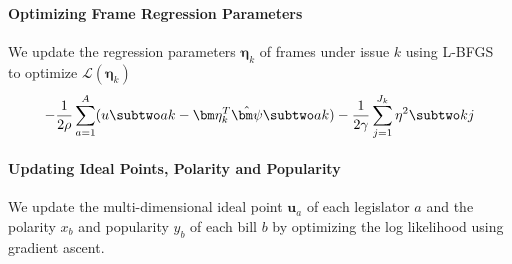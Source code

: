 \paragraph{Optimizing Frame Regression Parameters}
\label{subsec:c6_upadte_eta}

We update the regression parameters $\bm \eta_k$ of frames under issue $k$ using
L-BFGS~\cite{Liu:MP89:lbfgs} to optimize $\mathcal{L}(\bm \eta_k)$
\begin{equation}
  - \frac{1}{2 \rho} \sum_{a=1}^A (u \subtwo ak - \bm \eta_k^T \hat{\bm \psi} \subtwo ak)
  - \frac{1}{2 \gamma} \sum_{j=1}^{J_k} \eta^2 \subtwo kj
\end{equation}

\paragraph{Updating Ideal Points, Polarity and Popularity}
\label{subsec:c6_upadte_ideal_point}

We update the multi-dimensional ideal point $\bm u_a$ of each legislator $a$ and
the polarity $x_b$ and popularity $y_b$ of each bill $b$ by optimizing the log
likelihood using gradient ascent.


%
